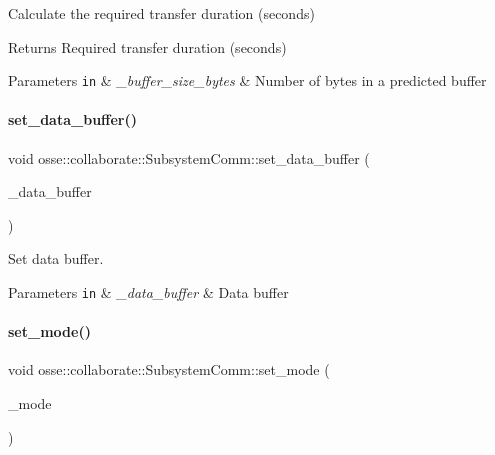 Calculate the required transfer duration (seconds) 

\begin{DoxyReturn}{Returns}
Required transfer duration (seconds) 
\end{DoxyReturn}

\begin{DoxyParams}[1]{Parameters}
\mbox{\tt in}  & {\em \+\_\+buffer\+\_\+size\+\_\+bytes} & Number of bytes in a predicted buffer \\
\hline
\end{DoxyParams}
\mbox{\label{classosse_1_1collaborate_1_1_subsystem_comm_a2679fccc19316e5fd32ff6e0786a0262}} 
\paragraph{\texorpdfstring{set\+\_\+data\+\_\+buffer()}{set\_data\_buffer()}}
{\footnotesize\ttfamily void osse\+::collaborate\+::\+Subsystem\+Comm\+::set\+\_\+data\+\_\+buffer (\begin{DoxyParamCaption}\item[{const std\+::vector$<$ uint8\+\_\+t $>$ \&}]{\+\_\+data\+\_\+buffer }\end{DoxyParamCaption})}



Set data buffer. 


\begin{DoxyParams}[1]{Parameters}
\mbox{\tt in}  & {\em \+\_\+data\+\_\+buffer} & Data buffer \\
\hline
\end{DoxyParams}
\mbox{\label{classosse_1_1collaborate_1_1_subsystem_comm_a25bea17a1d9e372e0e8da1dfe999fd75}} 
\paragraph{\texorpdfstring{set\+\_\+mode()}{set\_mode()}}
{\footnotesize\ttfamily void osse\+::collaborate\+::\+Subsystem\+Comm\+::set\+\_\+mode (\begin{DoxyParamCaption}\item[{const \hyperlink{classosse_1_1collaborate_1_1_subsystem_comm_a5e1ce4f232ca2aae0b99d1225e682190}{k\+Mode} \&}]{\+\_\+mode }\end{DoxyParamCaption})}



